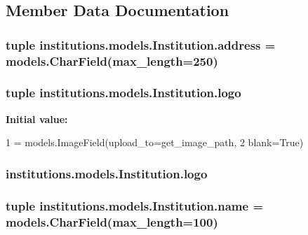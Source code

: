\subsection{Member Data Documentation}
\hypertarget{classinstitutions_1_1models_1_1_institution_a77aaa6298e0d54927ffdf1c68842e268}{
\subsubsection[{address}]{\setlength{\rightskip}{0pt plus 5cm}tuple institutions.\-models.\-Institution.\-address = models.\-Char\-Field(max\-\_\-length=250)\hspace{0.3cm}{\ttfamily [static]}}}\label{classinstitutions_1_1models_1_1_institution_a77aaa6298e0d54927ffdf1c68842e268}
\hypertarget{classinstitutions_1_1models_1_1_institution_a684486eaef9bc7435339ecfd40173408}{
\subsubsection[{logo}]{\setlength{\rightskip}{0pt plus 5cm}tuple institutions.\-models.\-Institution.\-logo\hspace{0.3cm}{\ttfamily [static]}}}\label{classinstitutions_1_1models_1_1_institution_a684486eaef9bc7435339ecfd40173408}
{\bfseries Initial value\-:}
\begin{DoxyCode}
1 = models.ImageField(upload\_to=get\_image\_path,
2                              blank=\textcolor{keyword}{True})
\end{DoxyCode}
\hypertarget{classinstitutions_1_1models_1_1_institution_a475660b2137b6a167330fb333a1947b9}{
\subsubsection[{logo}]{\setlength{\rightskip}{0pt plus 5cm}institutions.\-models.\-Institution.\-logo}}\label{classinstitutions_1_1models_1_1_institution_a475660b2137b6a167330fb333a1947b9}
\hypertarget{classinstitutions_1_1models_1_1_institution_a47d5d3011f5f9943d955f6bc6a14bee1}{
\subsubsection[{name}]{\setlength{\rightskip}{0pt plus 5cm}tuple institutions.\-models.\-Institution.\-name = models.\-Char\-Field(max\-\_\-length=100)\hspace{0.3cm}{\ttfamily [static]}}}\label{classinstitutions_1_1models_1_1_institution_a47d5d3011f5f9943d955f6bc6a14bee1}
